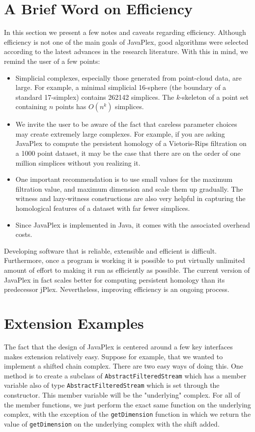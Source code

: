 \section{A Brief Word on Efficiency}

In this section we present a few notes and caveats regarding efficiency. Although efficiency is not one of the main goals of JavaPlex, good algorithms were selected according to the latest advances in the research literature. With this in mind, we remind the user of a few points:

\begin{itemize}
\item Simplicial complexes, especially those generated from point-cloud data, are large. For example, a minimal simplicial 16-sphere (the boundary of a standard 17-simplex) contains 262142 simplices. The $k$-skeleton of a point set containing $n$ points has $O(n^k)$ simplices.
\item We invite the user to be aware of the fact that careless parameter choices may create extremely large complexes. For example, if you are asking JavaPlex to compute the persistent homology of a Vietoris-Rips filtration on a 1000 point dataset, it may be the case that there are on the order of one million simplices without you realizing it.
\item One important recommendation is to use small values for the maximum filtration value, and maximum dimension and scale them up gradually. The witness and lazy-witness constructions are also very helpful in capturing the homological features of a dataset with far fewer simplices.
\item Since JavaPlex is implemented in Java, it comes with the associated overhead costs. 
\end{itemize}

Developing software that is reliable, extensible and efficient is difficult. Furthermore, once a program is working it is possible to put virtually unlimited amount of effort to making it run as efficiently as possible. The current version of JavaPlex in fact scales better for computing persistent homology than its predecessor jPlex. Nevertheless, improving efficiency is an ongoing process.

\section{Extension Examples}

The fact that the design of JavaPlex is centered around a few key interfaces makes extension relatively easy. Suppose for example, that we wanted to implement a shifted chain complex. There are two easy ways of doing this. One method is to create a subclass of {\tt AbstractFilteredStream} which has a member variable also of type {\tt AbstractFilteredStream} which is set through the constructor. This member variable will be the "underlying" complex. For all of the member functions, we just perform the exact same function on the underlying complex, with the exception of the {\tt getDimension} function in which we return the value of {\tt getDimension} on the underlying complex with the shift added.

